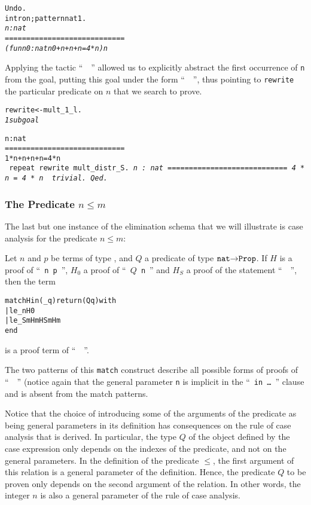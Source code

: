 \documentclass[11pt]{article}
\begin{document}
\begin{alltt}
 Undo.
 intro n; pattern n at 1.
 \it
 n : nat
  ============================
 (fun n0 : nat {\funarrow} n0 + n + n + n = 4 * n) n
\end{alltt}
Applying the tactic ``~~'' allowed us
to explicitly abstract the first occurrence of \texttt{n} from the
goal, putting this goal under the form ``~~'',
thus pointing to \texttt{rewrite} the particular predicate on $n$
that we search to prove.


\begin{alltt}
 rewrite <- mult_1_l.
\it
1 subgoal

  n : nat
  ============================
   1 * n + n + n + n = 4 * n
\tt
 repeat rewrite   mult_distr_S.
\it
  n : nat
  ============================
   4 * n = 4 * n
\tt
 trivial.
Qed.
\end{alltt}

\subsubsection{The Predicate $n {\leq} m$}


The last but one instance of the elimination schema that we will illustrate is
case analysis for the predicate $n {\leq} m$:

Let $n$ and $p$ be terms of type , and $Q$ a predicate
of type $\mbox{\texttt{nat}}\mbox{$\rightarrow$}{}\texttt{Prop}$.
If $H$ is a proof of ``~\texttt{n {\coqle} p}~'',
$H_0$ a proof of ``~\texttt{$Q$  n}~'' and
$H_S$ a proof of the statement ``~~'',
then the term
\begin{alltt}
match H in (_ {\coqle} q) return (Q q) with
    | le_n {\funarrow} H0
    | le_S m Hm {\funarrow} HS m Hm
end
\end{alltt}
 is a proof term of ``~~''.


The two patterns of this \texttt{match} construct describe
all possible forms of proofs of ``~~'' (notice
again that the general parameter \texttt{n} is implicit in
 the ``~\texttt{in \dots}~''
clause and is absent from the match patterns.


Notice that the choice of introducing some of the arguments of the
predicate as being general parameters in its definition has
consequences on the rule of case analysis that is derived. In
particular, the type $Q$ of the object defined by the case expression
only depends on the indexes of the predicate, and not on the general
parameters.  In the definition of the predicate $\leq$, the first
argument of this relation is a general parameter of the
definition. Hence, the predicate $Q$ to be proven only depends on the
second argument of the relation. In other words, the integer $n$ is
also a general parameter of the rule of case analysis.
\end{document}
